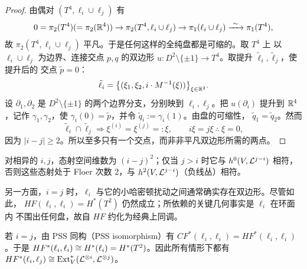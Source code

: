 \begin{proof}
由偶对 $(T^4,\ell_i\cup\ell_j)$ 有
\[
0=\pi_2(T^4)(=\pi_2(\mathbb{R}^4))\to\pi_2(T^4,\ell_i\cup\ell_j)\to\pi_1(\ell_i\cup\ell_j)
\xrightarrow{\ \sim\ }\pi_1(T^4),
\]
故 $\pi_2(T^4,\ell_i\cup\ell_j)$ 平凡。于是任何这样的全纯盘都是可缩的。取 $T^4$ 上
以 $\ell_i\cup\ell_j$ 为边界、连接交点 $p,q$ 的双边形
$u\colon D^2\setminus\{\pm1\}\to T^4$。取提升 $\tilde\ell_i,\tilde\ell_j$，使提升后的
交点 $\tilde p=0$：
\[
\tilde\ell_i=\bigl\{(\xi_1,\xi_2,i\cdot M^{-1}(\xi))\bigr\}_{\xi\in\mathbb{R}^2}.
\]
设 $\partial_1,\partial_2$ 是 $D^2\setminus\{\pm1\}$ 的两个边界分支，分别映到
$\ell_i,\ell_j$。把 $u(\partial_i)$ 提升到 $\mathbb{R}^4$，记作 $\gamma_1,\gamma_2$，使
$\gamma_i(0)=\tilde p$，并令 $\tilde q_i:=\gamma_i(1)$。由盘的可缩性，
$\tilde q_1=\tilde q_2$。然而
\[
\tilde\ell_i\cap\tilde\ell_j
\Longrightarrow \xi^{(i)}=\xi^{(j)}=:\xi,\qquad i\xi=j\xi\ \therefore\ \xi=0,
\]
因为 $|i-j|\ge2$。所以至多只有一个交点，而非非平凡双边形所需的两点。
\end{proof}



对相异的 $i,j$，态射空间维数为 $(i-j)^2$；仅当 $j>i$ 时它与
$h^0(V,\mathcal{L}^{j-i})$ 相符，否则这些态射处于 Floer 次数 $2$，与
$h^2(V,\mathcal{L}^{j-i})$（负线丛）相符。

另一方面，$i=j$ 时，$\ell_i$ 与它的小哈密顿扰动之间通常确实存在双边形。尽管如此，
$HF(\ell_i,\ell_i)=H^*(T^2)$ 仍然成立；所依赖的关键几何事实是 $\ell_i$ 在环面内
不围出任何盘，故自 $HF$ 约化为经典上同调。

若 $i=j$，由 PSS 同构（PSS isomorphism）有
$CF^*(\ell_i,\ell_i)=HF^*(\ell_i,\ell_i)$。于是
$HF^*(\ell_i,\ell_i)\cong H^*(\ell_i)=H^*(T^2)$。因此所有情形下都有
$HF^*(\ell_i,\ell_j)\cong\mathrm{Ext}^*_V(\mathcal{L}^{\otimes i},\mathcal{L}^{\otimes j})$。


